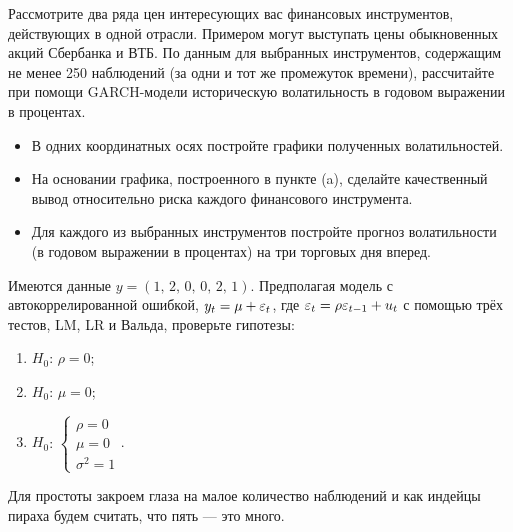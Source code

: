 \begin{problem}
Рассмотрите два ряда цен интересующих вас финансовых инструментов, действующих в одной отрасли. Примером могут выступать цены обыкновенных акций Сбербанка и ВТБ. По данным для выбранных инструментов, содержащим не менее 250 наблюдений (за одни и тот же промежуток времени), рассчитайте при помощи GARCH-модели историческую волатильность в годовом выражении в процентах.
\begin{itemize}
  \item В одних координатных осях постройте графики полученных волатильностей.
  \item На основании графика, построенного в пункте (a), сделайте качественный вывод относительно риска каждого финансового инструмента.
  \item Для каждого из выбранных инструментов постройте прогноз волатильности (в годовом выражении в процентах) на три торговых дня вперед.
\end{itemize}


\begin{sol}
\end{sol}
\end{problem}




\begin{problem}
Имеются данные $y=(1,\, 2,\, 0,\,  0,\, 2,\, 1)$. Предполагая модель с автокоррелированной ошибкой, $y_t=\mu+\varepsilon_t$, где $\varepsilon_t=\rho \varepsilon_{t-1}+u_t$ с помощью трёх тестов, LM, LR и Вальда, проверьте гипотезы:
\begin{enumerate}
\item $H_0$: $\rho=0$;
\item $H_0$: $\mu=0$;
\item $H_0$: $\begin{cases}
\rho=0 \\
\mu = 0 \\
\sigma^2=1
\end{cases}.$
\end{enumerate}



\begin{sol}

Для простоты закроем глаза на малое количество наблюдений и как индейцы пираха будем считать, что пять — это много.

\end{sol}
\end{problem}



